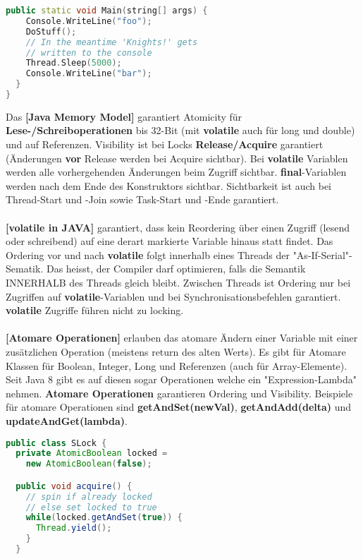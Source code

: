 \documentclass[8pt]{extarticle}
\let\oldtextbf\textbf
\renewcommand{\textbf}{\tiny\oldtextbf}
\begin{document}
\begin{multicols*}{5}
\begin{lstlisting}[language=c++]
  public static void Main(string[] args) {
    Console.WriteLine("foo");
    DoStuff();
    // In the meantime 'Knights!' gets
    // written to the console
    Thread.Sleep(5000);
    Console.WriteLine("bar");
  }
}
\end{lstlisting}
Das \textbf{[Java Memory Model]} garantiert Atomicity für \textbf{Lese-/Schreiboperationen} bis 32-Bit (mit \textbf{volatile} auch für long und double) und auf Referenzen. Visibility ist bei Locks \textbf{Release/Acquire} garantiert (Änderungen \textbf{vor} Release werden bei Acquire sichtbar). Bei \textbf{volatile} Variablen werden alle vorhergehenden Änderungen beim Zugriff sichtbar. \textbf{final}-Variablen werden nach dem Ende des Konstruktors sichtbar. Sichtbarkeit ist auch bei Thread-Start und -Join sowie Task-Start und -Ende garantiert.\\\\
\textbf{[volatile in JAVA]} garantiert, dass kein Reordering über einen Zugriff (lesend oder schreibend) auf eine derart markierte Variable hinaus statt findet. Das Ordering vor und nach \textbf{volatile} folgt innerhalb eines Threads der "As-If-Serial"-Sematik. Das heisst, der Compiler darf optimieren, falls die Semantik INNERHALB des Threads gleich bleibt. Zwischen Threads ist Ordering nur bei Zugriffen auf \textbf{volatile}-Variablen und bei Synchronisationsbefehlen garantiert. \textbf{volatile} Zugriffe führen nicht zu locking.\\\\
\textbf{[Atomare Operationen]} erlauben das atomare Ändern einer Variable mit einer zusätzlichen Operation (meistens return des alten Werts). Es gibt für Atomare Klassen für Boolean, Integer, Long und Referenzen (auch für Array-Elemente). Seit Java 8 gibt es auf diesen sogar Operationen welche ein "Expression-Lambda" nehmen. \textbf{Atomare Operationen} garantieren Ordering und Visibility. Beispiele für atomare Operationen sind \textbf{getAndSet(newVal)}, \textbf{getAndAdd(delta)} und \textbf{updateAndGet(lambda)}.
\begin{lstlisting}[language=java]
public class SLock {
  private AtomicBoolean locked =
    new AtomicBoolean(false);

  public void acquire() {
    // spin if already locked
    // else set locked to true
    while(locked.getAndSet(true)) {
      Thread.yield();
    }
  }


\end{lstlisting}
\end{multicols*}
\end{document}
